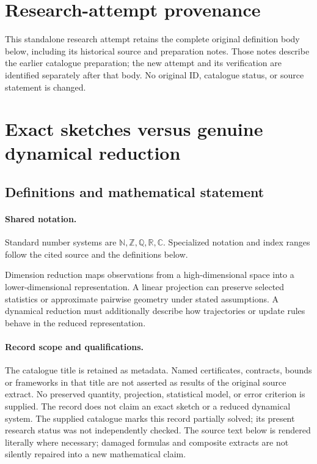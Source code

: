 \documentclass[11pt]{article}
\begin{document}
\section*{Research-attempt provenance}
This standalone research attempt retains the complete original definition body below,
including its historical source and preparation notes. Those notes describe the
earlier catalogue preparation; the new attempt and its verification are identified
separately after that body. No original ID, catalogue status, or source statement is changed.

\section{Exact sketches versus genuine dynamical reduction}\label{statement}

\subsection{Definitions and mathematical statement}

\paragraph{Shared notation.}Standard number systems are $\mathbb N,\mathbb Z,\mathbb Q,\mathbb R,\mathbb C$. Specialized notation and index ranges follow the cited source and the definitions below.


Dimension reduction maps observations from a high-dimensional space into a lower-dimensional representation. A linear projection can preserve selected statistics or approximate pairwise geometry under stated assumptions. A dynamical reduction must additionally describe how trajectories or update rules behave in the reduced representation.
\paragraph{Record scope and qualifications.}
The catalogue title is retained as metadata. Named certificates, contracts, bounds or frameworks in that title are not asserted as results of the original source extract.
No preserved quantity, projection, statistical model, or error criterion is supplied. The record does not claim an exact sketch or a reduced dynamical system. The supplied catalogue marks this record partially solved; its present research status was not independently checked.
The source text below is rendered literally where necessary; damaged formulas and composite extracts are not silently repaired into a new mathematical claim.
\end{document}
